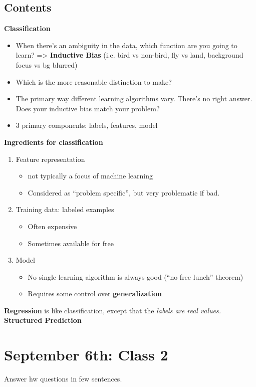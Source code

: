 \subsection{Contents}
\label{sec:contents}
\textbf{Classification}
\begin{itemize}
\item When there's an ambiguity in the data, which function are you
  going to learn? => \textbf{Inductive Bias} (i.e. bird vs non-bird,
  fly vs land, background focus vs bg blurred)
\item Which is the more reasonable distinction to make?
\item The primary way different learning algorithms vary. There's no
  right answer. Does your inductive bias match your problem?
\item 3 primary components: labels, features, model
\end{itemize}
\textbf{Ingredients for classification}
\begin{enumerate}
\item Feature representation
  \begin{itemize}
  \item not typically a focus of machine learning
  \item Considered as ``problem specific'', but very problematic if bad.
  \end{itemize}
\item Training data: labeled examples
  \begin{itemize}
  \item Often expensive
  \item Sometimes available for free
  \end{itemize}
\item Model
  \begin{itemize}
  \item No single learning algorithm is always good (``no free lunch''
    theorem)
  \item Requires some control over \textbf{generalization}
  \end{itemize}
\end{enumerate}


\textbf{Regression} is like classification, except that the \emph{labels are
real values.}
\textbf{Structured Prediction} 


\pagebreak
\section{September 6th: Class 2}
Answer hw questions in few sentences.

